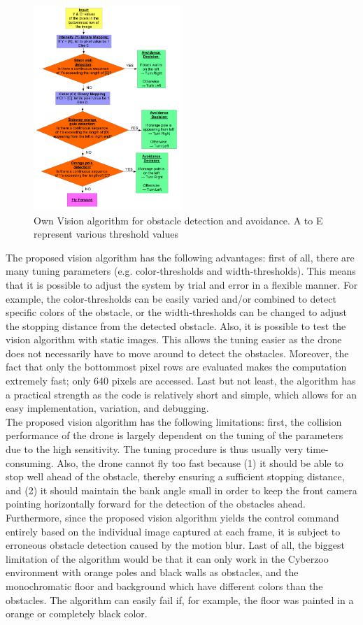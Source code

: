 \begin{figure}[H]
	\centering
	\includegraphics[width = 0.5\textwidth]{Figures/vision.png}
	\caption{Own Vision algorithm for obstacle detection and avoidance. A to E represent various threshold values}
	\label{own_vision}
\end{figure}

The proposed vision algorithm has the following advantages: first of all, there are many tuning parameters (e.g. color-thresholds and width-thresholds). This means that it is possible to adjust the system by trial and error in a flexible manner. For example, the color-thresholds can be easily varied and/or combined to detect specific colors of the obstacle, or the width-thresholds can be changed to adjust the stopping distance from the detected obstacle. Also, it is possible to test the vision algorithm with static images. This allows the tuning easier as the drone does not necessarily have to move around to detect the obstacles. Moreover, the fact that only the bottommost pixel rows are evaluated makes the computation extremely fast; only 640 pixels are accessed. Last but not least, the algorithm has a practical strength as the code is relatively short and simple, which allows for an easy implementation, variation, and debugging.\\

The proposed vision algorithm has the following limitations: first, the collision performance of the drone is largely dependent on the tuning of the parameters due to the high sensitivity. The tuning procedure is thus usually very time-consuming. Also, the drone cannot fly too fast because (1) it should be able to stop well ahead of the obstacle, thereby ensuring a sufficient stopping distance, and (2) it should maintain the bank angle small in order to keep the front camera pointing horizontally forward for the detection of the obstacles ahead. Furthermore, since the proposed vision algorithm yields the control command entirely based on the individual image captured at each frame, it is subject to erroneous obstacle detection caused by the motion blur. Last of all, the biggest limitation of the algorithm would be that it can only work in the Cyberzoo environment with orange poles and black walls as obstacles, and the monochromatic floor and background which have different colors than the obstacles. The algorithm can easily fail if, for example, the floor was painted in a orange or completely black color.